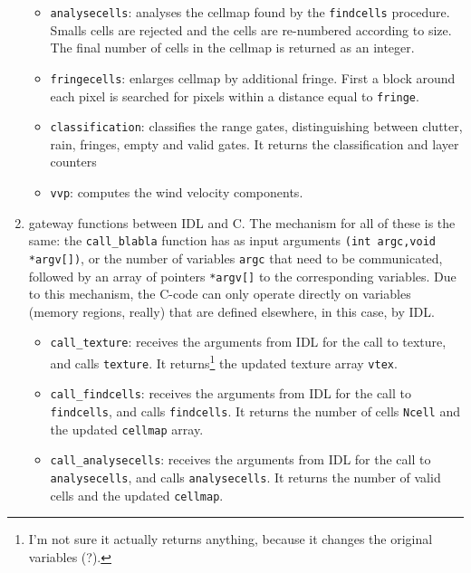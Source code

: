 \begin{enumerate}
\begin{itemize}
\item{\texttt{analysecells}: analyses the cellmap found by the \texttt{findcells} procedure. Smalls cells are rejected and the cells are re-numbered according to size. The final number of cells in the cellmap is returned as an integer.}

\item{\texttt{fringecells}: enlarges cellmap by additional fringe. First a block around each pixel is searched for pixels within a distance equal to \texttt{fringe}.}

\item{\texttt{classification}: classifies the range gates, distinguishing between clutter, rain, fringes, empty and valid gates. It returns the classification and layer counters}

\item{\texttt{vvp}: computes the wind velocity components.}

\end{itemize}


\item{gateway functions between IDL and C. The mechanism for all of these is the same: the \texttt{call\_blabla} function has as input arguments \texttt{(int argc,void *argv[])}, or the number of variables \texttt{argc} that need to be communicated, followed by an array of pointers \texttt{*argv[]} to the corresponding variables. Due to this mechanism, the C-code can only operate directly on variables (memory regions, really) that are defined elsewhere, in this case, by IDL.}


\begin{itemize}
\item{\texttt{call\_texture}: receives the arguments from IDL for the call to texture,          and calls \texttt{texture}. It returns\footnote{I'm not sure it actually returns anything, because it changes the original variables (?).} the updated texture array \texttt{vtex}.}

\item{\texttt{call\_findcells}: receives the arguments from IDL for the call to \texttt{findcells}, and calls \texttt{findcells}. It returns the number of cells \texttt{Ncell} and the updated \texttt{cellmap} array.}

\item{\texttt{call\_analysecells}: receives the arguments from IDL for the call to \texttt{analysecells}, and calls \texttt{analysecells}. It returns the number of valid cells and the updated \texttt{cellmap}.}


\end{itemize}
\end{enumerate}
